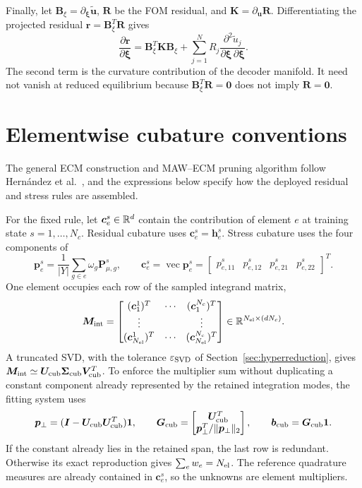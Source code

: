 Finally, let $\bm B_{\xi}=\partial_{\bm\xi}\widetilde{\bm u}$, $\bm R$ be the FOM residual, and $\bm K=\partial_{\bm u}\bm R$. Differentiating the projected residual $\bm r=\bm B_{\xi}^T\bm R$ gives
\begin{equation}
 \frac{\partial\bm r}{\partial\bm\xi}
 =\bm B_{\xi}^T\bm K\bm B_{\xi}
 +\sum_{j=1}^{N}R_j
   \frac{\partial^2\widetilde u_j}
        {\partial\bm\xi\,\partial\bm\xi}.
\end{equation}
The second term is the curvature contribution of the decoder manifold. It need not vanish at reduced equilibrium because $\bm B_{\xi}^T\bm R=\bm0$ does not imply $\bm R=\bm0$.

\section{Elementwise cubature conventions}
\label{app:cubature}
The general ECM construction and MAW--ECM pruning algorithm follow Hernández et al.~\cite{hernandez2017,hernandez2026dimensional}, and the expressions below specify how the deployed residual and stress rules are assembled.

For the fixed rule, let $\bm c_e^s\in\mathbb R^d$ contain the contribution of element $e$ at training state $s=1,\ldots,N_c$. Residual cubature uses $\bm c_e^s=\bm h_e^s$. Stress cubature uses the four components of
\begin{equation}
 \bm p_e^s=\frac{1}{|Y|}\sum_{g\in e}\omega_g\bm P_{\mu,g}^s,
 \qquad
 \bm c_e^s=\operatorname{vec}\bm p_e^s
 =\begin{bmatrix}p_{e,11}^s&p_{e,12}^s&p_{e,21}^s&p_{e,22}^s\end{bmatrix}^{T}.
\end{equation}
One element occupies each row of the sampled integrand matrix,
\begin{equation}
 \bm M_{\rm int}=
 \begin{bmatrix}
  (\bm c_1^1)^T&\cdots&(\bm c_1^{N_c})^T\\
  \vdots&&\vdots\\
  (\bm c_{N_{\rm el}}^1)^T&\cdots&(\bm c_{N_{\rm el}}^{N_c})^T
 \end{bmatrix}
 \in\mathbb R^{N_{\rm el}\times(dN_c)}.
\end{equation}
A truncated SVD, with the tolerance $\varepsilon_{\rm SVD}$ of Section~\ref{sec:hyperreduction}, gives $\bm M_{\rm int}\simeq\bm U_{\rm cub}\bm\Sigma_{\rm cub}\bm V_{\rm cub}^T$. To enforce the multiplier sum without duplicating a constant component already represented by the retained integration modes, the fitting system uses
\begin{equation}
 \bm p_\perp=(\bm I-\bm U_{\rm cub}\bm U_{\rm cub}^T)\bm1,
 \qquad
 \bm G_{\rm cub}=
 \begin{bmatrix}
  \bm U_{\rm cub}^T\\
  \bm p_\perp^T/\|\bm p_\perp\|_2
 \end{bmatrix},
 \qquad
 \bm b_{\rm cub}=\bm G_{\rm cub}\bm1.
\end{equation}
If the constant already lies in the retained span, the last row is redundant. Otherwise its exact reproduction gives $\sum_e w_e=N_{\rm el}$. The reference quadrature measures are already contained in $\bm c_e^s$, so the unknowns are element multipliers.

